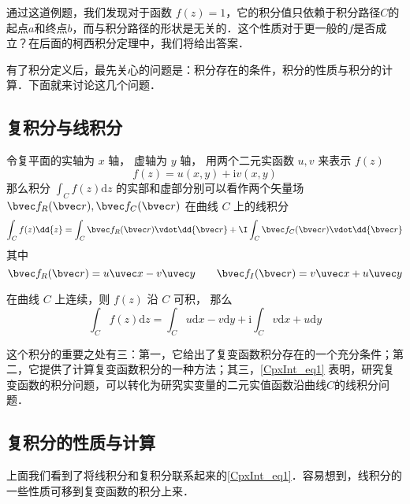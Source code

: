 通过这道例题，我们发现对于函数 $f(z)=1$，它的积分值只依赖于积分路径$C$的起点$a$和终点$b$，而与积分路径的形状是无关的．这个性质对于更一般的$f$是否成立？在后面的柯西积分定理中，我们将给出答案．

有了积分定义后，最先关心的问题是：积分存在的条件，积分的性质与积分的计算．下面就来讨论这几个问题．

\subsection{复积分与线积分}
\begin{theorem}{}
令复平面的实轴为 $x$ 轴， 虚轴为 $y$ 轴， 用两个二元实函数 $u, v$ 来表示 $f(z)$
\begin{equation}
f (z) = u(x, y) + \mathrm iv(x, y)
\end{equation}
那么积分 $\int_{C} f(z) \mathrm{d} z$ 的实部和虚部分别可以看作两个矢量场 $\bvec f_R(\bvec r), \bvec f_C(\bvec r)$ 在曲线 $C$ 上的线积分
\begin{equation}
\int_{C} f(z) \dd{z} = \int_C \bvec f_R(\bvec r) \vdot \dd{\bvec r} + \I \int_C \bvec f_C(\bvec r) \vdot \dd{\bvec r}
\end{equation}
其中
\begin{equation}
\bvec f_R(\bvec r) = u\uvec x - v\uvec y
\qquad
\bvec f_I(\bvec r) = v\uvec x + u\uvec y
\end{equation}
\end{theorem}

 在曲线 $C$ 上连续，则 $f (z)$ 沿 $C$ 可积， 那么
\begin{equation} \label{CpxInt_eq1}
\int_{C} f(z) \mathrm{d} z=\int_{C} u \mathrm{d} x-v \mathrm{d} y+\mathrm{i} \int_{C} v \mathrm{d} x+u \mathrm{d} y
\end{equation}

这个积分的重要之处有三：第一，它给出了复变函数积分存在的一个充分条件；第二，它提供了计算复变函数积分的一种方法；其三，\autoref{CpxInt_eq1} 表明，研究复变函数的积分问题，可以转化为研究实变量的二元实值函数沿曲线$C $的线积分问题．

\subsection{复积分的性质与计算}

上面我们看到了将线积分和复积分联系起来的\autoref{CpxInt_eq1}．容易想到，线积分的一些性质可移到复变函数的积分上来．

